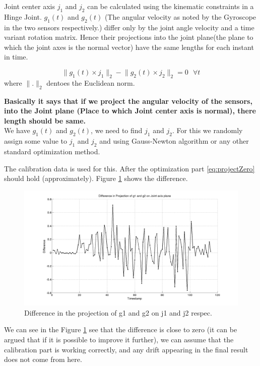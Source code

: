 \documentclass[12pt]{article}
\begin{document}
Joint center axis $ j_1 $ and $ j_2 $ can be calculated using the kinematic constraints in a Hinge Joint. $ g_1(t) $ and $ g_2(t) $ (The angular velocity as noted by the Gyroscope in the two sensors respectively.) differ only by the joint angle velocity and a time variant rotation matrix. Hence their projections into the joint plane(the plane to which the joint axes is the normal vector) have the same lengths for each instant in time.


\begin{equation}\label{eq:projectZero}
{\lVert}g_1(t) \times j_1 {\rVert}_2 - {\lVert}g_2(t) \times j_2 {\rVert}_2 = 0\text{ } \forall t
\end{equation}
where $ \lVert . \rVert _2 $ dentoes the Euclidean norm. \vspace{1em}

\textbf{Basically it says that if we project the angular velocity of the sensors, into the Joint plane (Place to which Joint center axis is normal), there length should be same.}\\

We have $ g_1(t) $ and $ g_2(t) $, we need to find $ j_1 $ and $ j_2 $. For this we randomly assign some value to $ j_1 $ and $ j_2 $  and using Gauss-Newton algorithm or any other standard optimization method.

The calibration data is used for this. After the optimization part \ref{eq:projectZero} should hold (approximately). Figure \ref{diffproject} shows the difference.

\begin{figure}[!htb]
\includegraphics[scale=.3,center]{diffproject.png}
\caption{Difference in the projection of g1 and g2 on j1 and j2 respec.}
\label{diffproject}
\end{figure}
\FloatBarrier
We can see in the Figure \ref{diffproject} see that the difference is close to zero (it can be argued that if it  is possible to improve it further), we can assume that the calibration part is working correctly, and any drift appearing in the final result does not come from here.\\
\end{document}
